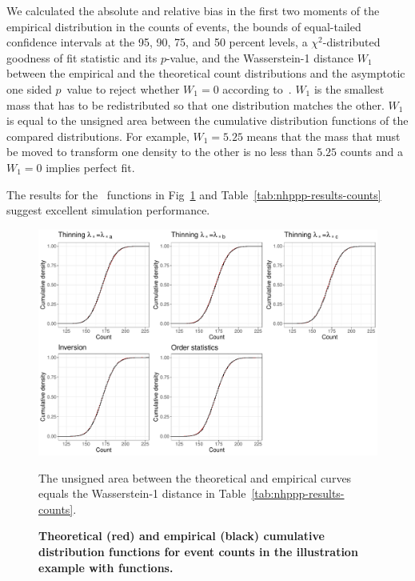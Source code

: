 \documentclass[article,nojss]{jss}\usepackage[]{graphicx}\usepackage[]{xcolor}
\makeatletter
\def\maxwidth{ %
  \ifdim\Gin@nat@width>\linewidth
    \linewidth
  \else
    \Gin@nat@width
  \fi
}
\makeatother
\begin{document}
We calculated the absolute and relative bias in the first two moments of the empirical distribution in the counts of events, the bounds of equal-tailed confidence intervals at the 95, 90, 75, and 50 percent levels, a $\chi^2$-distributed goodness of fit statistic and its $p$-value, and the Wasserstein-1 distance $W_1$ between the empirical and the theoretical count distributions and the asymptotic one sided $p$~value to reject whether $W_1 = 0$ according to~\cite{sommerfeld2018inference}. $W_1$ is the smallest mass that has to be redistributed so that one distribution matches the other. $W_1$ is equal to the unsigned area between the cumulative distribution functions of the compared distributions. For example, $W_1 = 5.25$ means that the mass that must be moved to transform one density to the other is no less than $5.25$ counts and a $W_1 = 0$ implies perfect fit.





The results for the~ functions in Fig~\ref{fig:ecdf-nhppp-pkg-counts} and Table~\ref{tab:nhppp-results-counts} suggest excellent simulation performance.


\begin{Schunk}
\begin{figure}[ht!]
\caption{{\bf Theoretical (red) and empirical (black) cumulative distribution functions for event counts in the illustration example with  functions. }}\label{fig:ecdf-nhppp-pkg-counts}
\includegraphics[width=\maxwidth]{figure/ecdf-nhppp-pkg-counts-1} 
\begin{flushleft}
The unsigned area between the theoretical and empirical curves equals the Wasserstein-1 distance in Table~\ref{tab:nhppp-results-counts}.
\end{flushleft}
\end{figure}
\end{Schunk}
\end{document}
